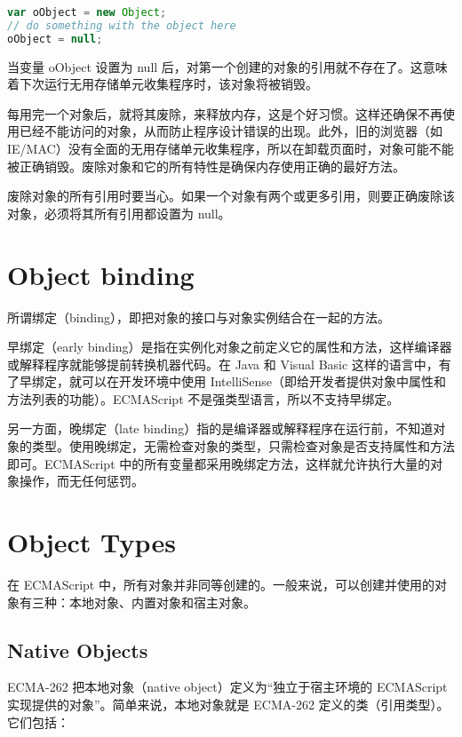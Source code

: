 \begin{lstlisting}[language=JavaScript]
var oObject = new Object;
// do something with the object here
oObject = null;
\end{lstlisting}


当变量 oObject 设置为 null 后，对第一个创建的对象的引用就不存在了。这意味着下次运行无用存储单元收集程序时，该对象将被销毁。

每用完一个对象后，就将其废除，来释放内存，这是个好习惯。这样还确保不再使用已经不能访问的对象，从而防止程序设计错误的出现。此外，旧的浏览器（如 IE/MAC）没有全面的无用存储单元收集程序，所以在卸载页面时，对象可能不能被正确销毁。废除对象和它的所有特性是确保内存使用正确的最好方法。

废除对象的所有引用时要当心。如果一个对象有两个或更多引用，则要正确废除该对象，必须将其所有引用都设置为 null。

\chapter{Object binding}


所谓绑定（binding），即把对象的接口与对象实例结合在一起的方法。

早绑定（early binding）是指在实例化对象之前定义它的属性和方法，这样编译器或解释程序就能够提前转换机器代码。在 Java 和 Visual Basic 这样的语言中，有了早绑定，就可以在开发环境中使用 IntelliSense（即给开发者提供对象中属性和方法列表的功能）。ECMAScript 不是强类型语言，所以不支持早绑定。

另一方面，晚绑定（late binding）指的是编译器或解释程序在运行前，不知道对象的类型。使用晚绑定，无需检查对象的类型，只需检查对象是否支持属性和方法即可。ECMAScript 中的所有变量都采用晚绑定方法，这样就允许执行大量的对象操作，而无任何惩罚。




\chapter{Object Types}

在 ECMAScript 中，所有对象并非同等创建的。一般来说，可以创建并使用的对象有三种：本地对象、内置对象和宿主对象。



\section{Native Objects}

ECMA-262 把本地对象（native object）定义为“独立于宿主环境的 ECMAScript 实现提供的对象”。简单来说，本地对象就是 ECMA-262 定义的类（引用类型）。它们包括：



